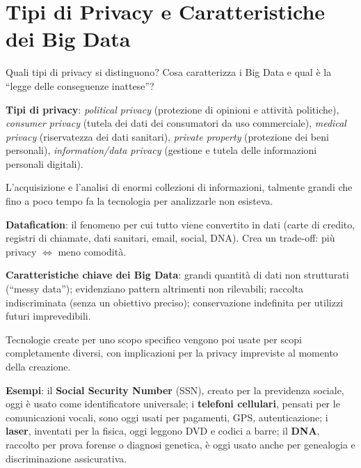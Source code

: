 \documentclass[a4paper,11pt]{article}
\begin{document}
\section{Tipi di Privacy e Caratteristiche dei Big Data}

\begin{domanda}
Quali tipi di privacy si distinguono? Cosa caratterizza i Big Data e qual \`{e} la ``legge delle conseguenze inattese''?
\end{domanda}

\textbf{Tipi di privacy}: \emph{political privacy} (protezione di opinioni e attivit\`{a} politiche), \emph{consumer privacy} (tutela dei dati dei consumatori da uso commerciale), \emph{medical privacy} (riservatezza dei dati sanitari), \emph{private property} (protezione dei beni personali), \emph{information/data privacy} (gestione e tutela delle informazioni personali digitali).

\begin{definizione}
L'acquisizione e l'analisi di enormi collezioni di informazioni, talmente grandi che fino a poco tempo fa la tecnologia per analizzarle non esisteva.
\end{definizione}

\textbf{Datafication}: il fenomeno per cui tutto viene convertito in dati (carte di credito, registri di chiamate, dati sanitari, email, social, DNA). Crea un trade-off: pi\`{u} privacy $\Leftrightarrow$ meno comodit\`{a}.

\textbf{Caratteristiche chiave dei Big Data}: grandi quantit\`{a} di dati non strutturati (``messy data''); evidenziano pattern altrimenti non rilevabili; raccolta indiscriminata (senza un obiettivo preciso); conservazione indefinita per utilizzi futuri imprevedibili.

\begin{definizione}
Tecnologie create per uno scopo specifico vengono poi usate per scopi completamente diversi, con implicazioni per la privacy impreviste al momento della creazione.
\end{definizione}

\textbf{Esempi}: il \textbf{Social Security Number} (SSN), creato per la previdenza sociale, oggi \`{e} usato come identificatore universale; i \textbf{telefoni cellulari}, pensati per le comunicazioni vocali, sono oggi usati per pagamenti, GPS, autenticazione; i \textbf{laser}, inventati per la fisica, oggi leggono DVD e codici a barre; il \textbf{DNA}, raccolto per prova forense o diagnosi genetica, \`{e} oggi usato anche per genealogia e discriminazione assicurativa.
\end{document}
